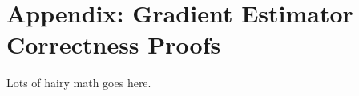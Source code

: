 \section{Appendix: Gradient Estimator Correctness Proofs}
\label{sec:appendix_proofs}

Lots of hairy math goes here.